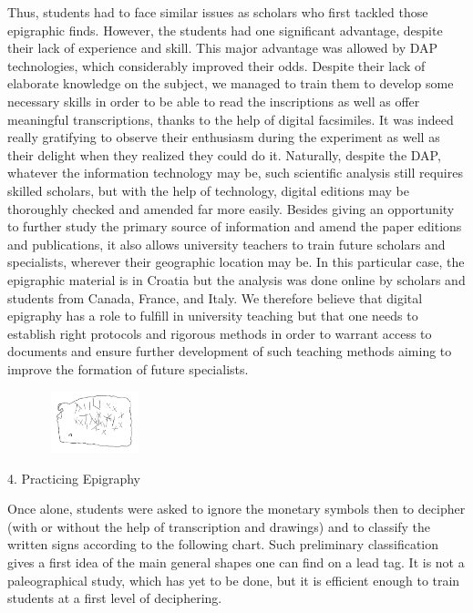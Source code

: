 \documentclass[amsthm,ebook]{saparticle}
\begin{document}
Thus, students had to face similar issues as scholars who first tackled those epigraphic finds. However, the students
had one significant advantage, despite their lack of experience and skill. This major advantage was allowed by DAP
technologies, which considerably improved their odds. Despite their lack of elaborate knowledge on the subject, we
managed to train them to develop some necessary skills in order to be able to read the inscriptions as well as offer
meaningful transcriptions, thanks to the help of digital facsimiles. It was indeed really gratifying to observe their
enthusiasm during the experiment as well as their delight when they realized they could do it. Naturally, despite the
DAP, whatever the information technology may be, such scientific analysis still requires skilled scholars, but with the
help of technology, digital editions may be thoroughly checked and amended far more easily. Besides giving an
opportunity to further study the primary source of information and amend the paper editions and publications, it also
allows university teachers to train future scholars and specialists, wherever their geographic location may be. In this
particular case, the epigraphic material is in Croatia but the analysis was done online by scholars and students from
Canada, France, and Italy. We therefore believe that digital epigraphy has a role to fulfill in university teaching but
that one needs to establish right protocols and rigorous methods in order to warrant access to documents and ensure
further development of such teaching methods aiming to improve the formation of future specialists.

\begin{figure}
\centering
\includegraphics[width=2.965cm,height=1.79cm]{EAGLE16lameetalteaching-img006.png}
\end{figure}
4. Practicing Epigraphy

Once alone, students were asked to ignore the monetary symbols then to decipher (with or without the help of
transcription and drawings) and to classify the written signs according to the following chart. Such preliminary
classification gives a first idea of the main general shapes one can find on a lead tag. It is not a paleographical
study, which has yet to be done, but it is efficient enough to train students at a first level of deciphering.
\end{document}
